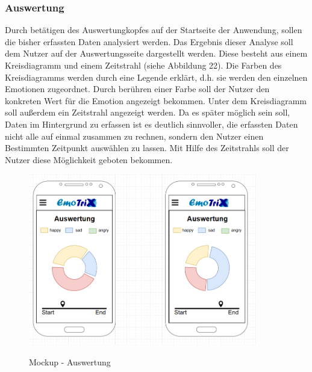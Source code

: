 \subsubsection{Auswertung}
Durch betätigen des Auswertungkopfes auf der Startseite der Anwendung, sollen die bisher erfassten Daten analysiert werden. Das Ergebnis dieser Analyse soll dem Nutzer auf der Auswertungsseite dargestellt werden. Diese besteht aus einem Kreisdiagramm und einem Zeitstrahl (siehe Abbildung 22).
\newline
Die Farben des Kreisdiagramms werden durch eine Legende erklärt, d.h. sie werden den einzelnen Emotionen zugeordnet. Durch berühren einer Farbe soll der Nutzer den konkreten Wert für die Emotion angezeigt bekommen. Unter dem Kreisdiagramm soll außerdem ein Zeitstrahl angezeigt werden. Da es später möglich sein soll, Daten im Hintergrund zu erfassen ist es deutlich sinnvoller, die erfassten Daten nicht alle auf einmal zusammen zu rechnen, sondern den Nutzer einen Bestimmten Zeitpunkt auswählen zu lassen. Mit Hilfe des Zeitstrahls soll der Nutzer diese Möglichkeit geboten bekommen. 
\begin{figure}[h]
	\centering
	\includegraphics[width=10cm]{Bilder/Mockup-Auswertung.png}
	\label{img:Mockup-Auswertung}
	\caption[Mockup - Auswertung]{Mockup - Auswertung}
\end{figure}
\newline \newline \newline \newline \newline \newline